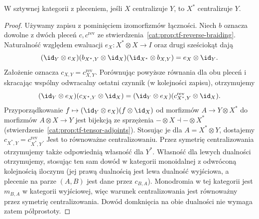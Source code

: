 \begin{lemat}\label{cat:lem:tf-centralizing-duals}
W sztywnej kategorii z pleceniem, jeśli $X$ centralizuje $Y$, to $X^*$ centralizuje $Y$.
\end{lemat}
\begin{proof}
Używamy zapisu z pominięciem izomorfizmów łączności. Niech $b$ oznacza dowolne z dwóch pleceń $c,c^{\mathrm{rev}}$ ze stwierdzenia~\ref{cat:prop:tf-reverse-braiding}. Naturalność względem ewaluacji $e_X:X^*\otimes X\to I$ oraz drugi sześciokąt dają
\[
 (\id_Y\otimes e_X)(b_{X^*,Y}\otimes\id_X)
 (\id_{X^*}\otimes b_{X,Y})=e_X\otimes\id_Y.
\]
Założenie oznacza $c_{X,Y}=c^{\mathrm{rev}}_{X,Y}$. Porównując powyższe równania dla obu pleceń i skracając wspólny odwracalny ostatni czynnik (w kolejności zapisu), otrzymujemy
\[
 (\id_Y\otimes e_X)(c_{X^*,Y}\otimes\id_X)
 =(\id_Y\otimes e_X)(c^{\mathrm{rev}}_{X^*,Y}\otimes\id_X).
\]
Przyporządkowanie $f\mapsto(\id_Y\otimes e_X)(f\otimes\id_X)$ od morfizmów $A\to Y\otimes X^*$ do morfizmów $A\otimes X\to Y$ jest bijekcją ze sprzężenia $-\otimes X\dashv-\otimes X^*$ (stwierdzenie~\ref{cat:prop:tf-tensor-adjoints}). Stosując je dla $A=X^*\otimes Y$, dostajemy $c_{X^*,Y}=c^{\mathrm{rev}}_{X^*,Y}$. Jest to równoważne centralizowaniu. Przez symetrię centralizowania otrzymujemy także odpowiednią własność dla $Y^*$. Własność dla lewych dualności otrzymujemy, stosując ten sam dowód w kategorii monoidalnej z odwróconą kolejnością iloczynu (jej prawą dualnością jest lewa dualność wyjściowa, a plecenie na parze $(A,B)$ jest dane przez $c_{B,A}$). Monodromia w tej kategorii jest $m_{B,A}$ w kategorii wyjściowej, więc warunek centralizowania jest równoważny przez symetrię centralizowania. Dowód domknięcia na obie dualności nie wymaga zatem półprostoty.
\end{proof}

